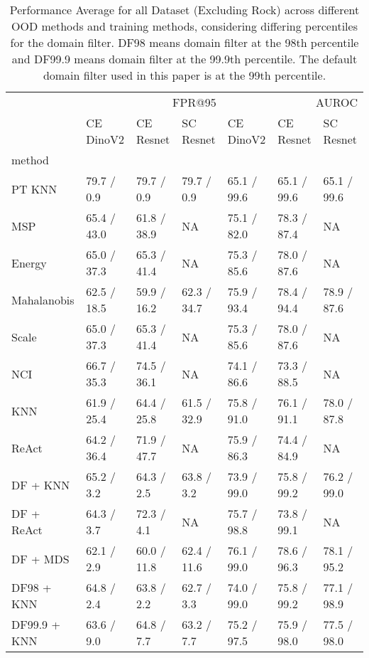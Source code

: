 \documentclass[letterpaper]{article} %
\theoremstyle{plain}
\theoremstyle{definition}
\theoremstyle{remark}
\begin{document}
\begin{sidewaystable}

\caption{Performance Average for all Dataset (Excluding Rock) across different OOD methods and training methods, considering differing percentiles for the domain filter.  DF98 means domain filter at the 98th percentile and DF99.9 means domain filter at the 99.9th percentile. The default domain filter used in this paper is at the 99th percentile.  }
\label{tab:threshold2}
\begin{tabular}{lllllll}
\toprule
 & \multicolumn{3}{r}{FPR@95} & \multicolumn{3}{r}{AUROC} \\
 & CE DinoV2 & CE Resnet & SC Resnet & CE DinoV2 & CE Resnet & SC Resnet \\
method &  &  &  &  &  &  \\
\midrule
PT KNN & 79.7 / 0.9 & 79.7 / 0.9 & 79.7 / 0.9 & 65.1 / 99.6 & 65.1 / 99.6 & 65.1 / 99.6 \\
MSP & 65.4 / 43.0 & 61.8 / 38.9 & NA & 75.1 / 82.0 & 78.3 / 87.4 & NA \\
Energy & 65.0 / 37.3 & 65.3 / 41.4 & NA & 75.3 / 85.6 & 78.0 / 87.6 & NA \\
Mahalanobis & 62.5 / 18.5 & 59.9 / 16.2 & 62.3 / 34.7 & 75.9 / 93.4 & 78.4 / 94.4 & 78.9 / 87.6 \\
Scale & 65.0 / 37.3 & 65.3 / 41.4 & NA & 75.3 / 85.6 & 78.0 / 87.6 & NA \\
NCI & 66.7 / 35.3 & 74.5 / 36.1 & NA & 74.1 / 86.6 & 73.3 / 88.5 & NA \\
KNN & 61.9 / 25.4 & 64.4 / 25.8 & 61.5 / 32.9 & 75.8 / 91.0 & 76.1 / 91.1 & 78.0 / 87.8 \\
ReAct & 64.2 / 36.4 & 71.9 / 47.7 & NA & 75.9 / 86.3 & 74.4 / 84.9 & NA \\
DF + KNN & 65.2 / 3.2 & 64.3 / 2.5 & 63.8 / 3.2 & 73.9 / 99.0 & 75.8 / 99.2 & 76.2 / 99.0 \\
DF + ReAct & 64.3 / 3.7 & 72.3 / 4.1 & NA & 75.7 / 98.8 & 73.8 / 99.1 & NA \\
DF + MDS & 62.1 / 2.9 & 60.0 / 11.8 & 62.4 / 11.6 & 76.1 / 99.0 & 78.6 / 96.3 & 78.1 / 95.2 \\
DF98 + KNN & 64.8 / 2.4 & 63.8 / 2.2 & 62.7 / 3.3 & 74.0 / 99.0 & 75.8 / 99.2 & 77.1 / 98.9 \\
DF99.9 + KNN & 63.6 / 9.0 & 64.8 / 7.7 & 63.2 / 7.7 & 75.2 / 97.5 & 75.9 / 98.0 & 77.5 / 98.0 \\
\bottomrule
\end{tabular}
    
\end{sidewaystable}
\end{document}
